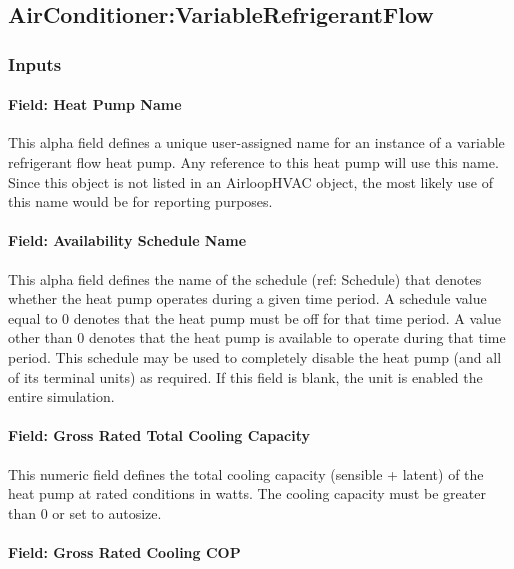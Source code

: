 \subsection{AirConditioner:VariableRefrigerantFlow}\label{airconditionervariablerefrigerantflow}
\subsubsection{Inputs}\label{inputs-051}

\paragraph{Field: Heat Pump Name}\label{field-heat-pump-name}

This alpha field defines a unique user-assigned name for an instance of a variable refrigerant flow heat pump. Any reference to this heat pump will use this name. Since this object is not listed in an AirloopHVAC object, the most likely use of this name would be for reporting purposes.

\paragraph{Field: Availability Schedule Name}\label{field-availability-schedule-name-018}

This alpha field defines the name of the schedule (ref: Schedule) that denotes whether the heat pump operates during a given time period. A schedule value equal to 0 denotes that the heat pump must be off for that time period. A value other than 0 denotes that the heat pump is available to operate during that time period. This schedule may be used to completely disable the heat pump (and all of its terminal units) as required. If this field is blank, the unit is enabled the entire simulation.

\paragraph{Field: Gross Rated Total Cooling Capacity}\label{field-gross-rated-total-cooling-capacity-001}

This numeric field defines the total cooling capacity (sensible + latent) of the heat pump at rated conditions in watts. The cooling capacity must be greater than 0 or set to autosize.

\paragraph{Field: Gross Rated Cooling COP}\label{field-gross-rated-cooling-cop-001}

